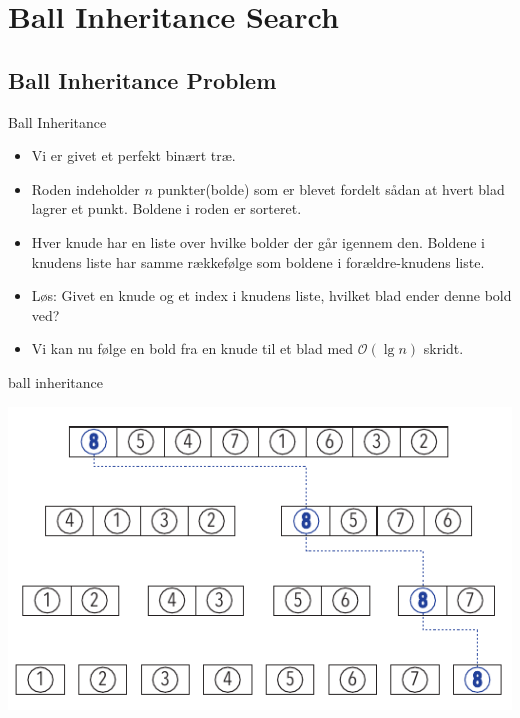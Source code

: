 \documentclass[pdf]{beamer}
\begin{document}

\section{Ball Inheritance Search}

\subsection{Ball Inheritance Problem}



\begin{frame}{Ball Inheritance}

  \begin{itemize}
    \item Vi er givet et perfekt binært træ.
      \pause
    \item Roden indeholder $n$ punkter(bolde) som er blevet fordelt sådan at hvert blad lagrer et punkt. Boldene i roden er sorteret.
      \pause
    \item Hver knude har en liste over hvilke bolder der går igennem den. Boldene i knudens liste har samme rækkefølge som boldene i forældre-knudens liste.
     \pause
    \item Løs: Givet en knude og et index i knudens liste, hvilket blad ender denne bold ved?
     \pause
    \item Vi kan nu følge en bold fra en knude til et blad med $\mathcal{O}(\lg n)$ skridt. 

  \end{itemize}
\end{frame}


\begin{frame}{ball inheritance}
  \begin{center}
    \includegraphics[scale=1.0]{pictures/bolde_8.pdf}
  \end{center}
\end{frame}
\end{document}
